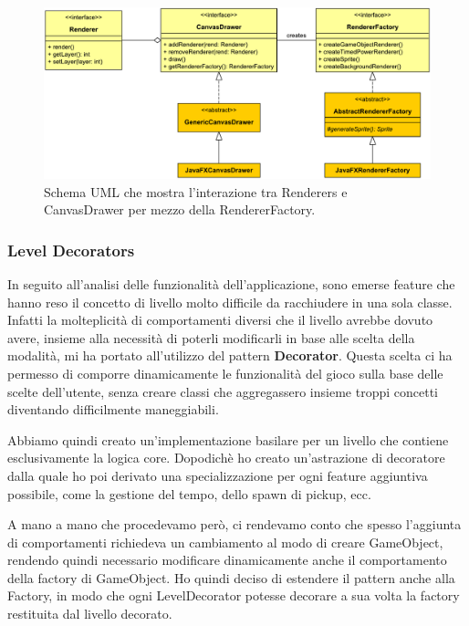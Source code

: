 \documentclass[a4paper,12pt]{report}
\begin{document}
\begin{figure}[H]
\includegraphics[width=\linewidth]{img/canvas_drawer}
\caption{Schema UML che mostra l'interazione tra Renderers e CanvasDrawer per mezzo della RendererFactory.}
\label{img:canvas_drawer}
\end{figure}

\subsubsection*{Level Decorators}

In seguito all'analisi delle funzionalità dell'applicazione, sono emerse feature che hanno reso il concetto di livello molto difficile da racchiudere in una sola classe.
Infatti la molteplicità di comportamenti diversi che il livello avrebbe dovuto avere, insieme alla necessità di poterli modificarli in base alle scelta della modalità, mi ha portato all'utilizzo del pattern \textbf{Decorator}.
Questa scelta ci ha permesso di comporre dinamicamente le funzionalità del gioco sulla base delle scelte dell'utente, senza creare classi che aggregassero insieme troppi concetti diventando difficilmente maneggiabili.

Abbiamo quindi creato un'implementazione basilare per un livello che contiene esclusivamente la logica core.
Dopodichè ho creato un'astrazione di decoratore dalla quale ho poi derivato una specializzazione per ogni feature aggiuntiva possibile, come la gestione del tempo, dello spawn di pickup, ecc.

A mano a mano che procedevamo però, ci rendevamo conto che spesso l'aggiunta di comportamenti richiedeva un cambiamento al modo di creare GameObject, rendendo quindi necessario modificare dinamicamente anche il comportamento della factory di GameObject.
Ho quindi deciso di estendere il pattern anche alla Factory, in modo che ogni LevelDecorator potesse decorare a sua volta la factory restituita dal livello decorato.
\end{document}
